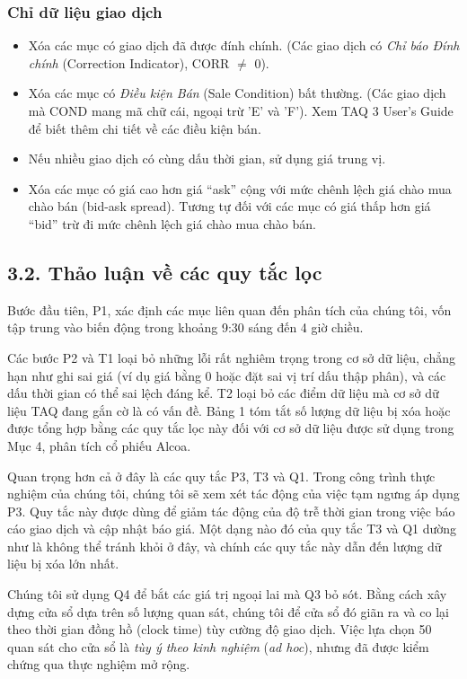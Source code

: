 \subsubsection*{Chỉ dữ liệu giao dịch}

\begin{itemize}
  \item[\textbf{T1.}] Xóa các mục có giao dịch đã được đính chính. (Các giao dịch có \emph{Chỉ báo Đính chính} (Correction Indicator), CORR $\neq$ 0).
  \item[\textbf{T2.}] Xóa các mục có \emph{Điều kiện Bán} (Sale Condition) bất thường. (Các giao dịch mà COND mang mã chữ cái, ngoại trừ 'E' và 'F'). Xem TAQ 3 User's Guide để biết thêm chi tiết về các điều kiện bán.
  \item[\textbf{T3.}] Nếu nhiều giao dịch có cùng dấu thời gian, sử dụng giá trung vị.
  \item[\textbf{T4.}] Xóa các mục có giá cao hơn giá ``ask'' cộng với mức chênh lệch giá chào mua chào bán (bid-ask spread). Tương tự đối với các mục có giá thấp hơn giá ``bid'' trừ đi mức chênh lệch giá chào mua chào bán.
\end{itemize}

\subsection*{3.2. Thảo luận về các quy tắc lọc}

Bước đầu tiên, P1, xác định các mục liên quan đến phân tích của chúng tôi, vốn tập trung vào biến động trong khoảng 9:30 sáng đến 4 giờ chiều.

Các bước P2 và T1 loại bỏ những lỗi rất nghiêm trọng trong cơ sở dữ liệu, chẳng hạn như ghi sai giá (ví dụ giá bằng 0 hoặc đặt sai vị trí dấu thập phân), và các dấu thời gian có thể sai lệch đáng kể. T2 loại bỏ các điểm dữ liệu mà cơ sở dữ liệu TAQ đang gắn cờ là có vấn đề. Bảng 1 tóm tắt số lượng dữ liệu bị xóa hoặc được tổng hợp bằng các quy tắc lọc này đối với cơ sở dữ liệu được sử dụng trong Mục 4, phân tích cổ phiếu Alcoa.

Quan trọng hơn cả ở đây là các quy tắc P3, T3 và Q1. Trong công trình thực nghiệm của chúng tôi, chúng tôi sẽ xem xét tác động của việc tạm ngưng áp dụng P3. Quy tắc này được dùng để giảm tác động của độ trễ thời gian trong việc báo cáo giao dịch và cập nhật báo giá. Một dạng nào đó của quy tắc T3 và Q1 dường như là không thể tránh khỏi ở đây, và chính các quy tắc này dẫn đến lượng dữ liệu bị xóa lớn nhất.

Chúng tôi sử dụng Q4 để bắt các giá trị ngoại lai mà Q3 bỏ sót. Bằng cách xây dựng cửa sổ dựa trên số lượng quan sát, chúng tôi để cửa sổ đó giãn ra và co lại theo thời gian đồng hồ (clock time) tùy cường độ giao dịch. Việc lựa chọn 50 quan sát cho cửa sổ là \emph{tùy ý theo kinh nghiệm} (\emph{ad hoc}), nhưng đã được kiểm chứng qua thực nghiệm mở rộng.

